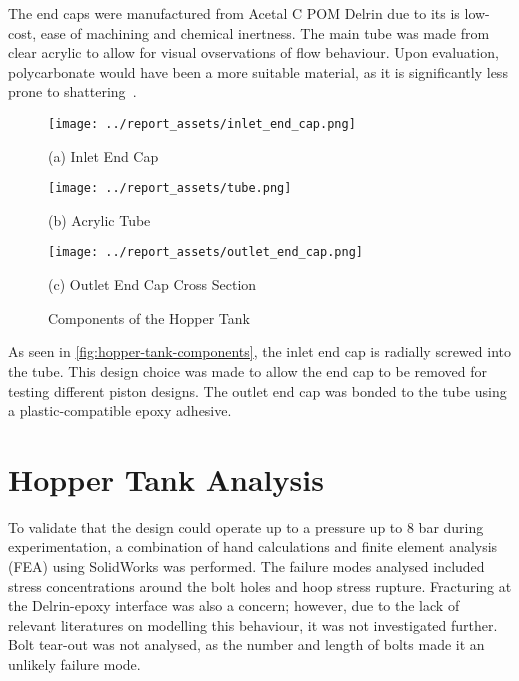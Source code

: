 The end caps were manufactured from Acetal C POM Delrin due to its is low-cost, ease of machining and chemical inertness. The main tube was made from clear acrylic to allow for visual ovservations of flow behaviour. Upon evaluation, polycarbonate would have been a more suitable material, as it is significantly less prone to shattering~\cite{SADEGHIESFAHLANI2021e06856}.
\begin{figure}[htbp]
    \centering

    \begin{minipage}{0.3\textwidth}
        \centering
        \texttt{[image: ../report\_assets/inlet\_end\_cap.png]}
        \caption*{(a) Inlet End Cap}
    \end{minipage}
    \hfill
    \begin{minipage}{0.3\textwidth}
        \centering
        \texttt{[image: ../report\_assets/tube.png]}
        \caption*{(b) Acrylic Tube}
    \end{minipage}
    \hfill
    \begin{minipage}{0.3\textwidth}
        \centering
        \texttt{[image: ../report\_assets/outlet\_end\_cap.png]}
        \caption*{(c) Outlet End Cap Cross Section}
    \end{minipage}
    \caption{Components of the Hopper Tank}\label{fig:hopper-tank-components}
\end{figure}
As seen in \autoref{fig:hopper-tank-components}, the inlet end cap is radially screwed into the tube. This design choice was made to allow the end cap to be removed for testing different piston designs. The outlet end cap was bonded to the tube using a plastic-compatible epoxy adhesive.

\section{Hopper Tank Analysis}\label{sec:tank-fea-setup}
To validate that the design could operate up to a pressure up to 8 bar during experimentation, a combination of hand calculations and finite element analysis (FEA) using SolidWorks was performed. The failure modes analysed included stress concentrations around the bolt holes and hoop stress rupture. Fracturing at the Delrin-epoxy interface was also a concern; however, due to the lack of relevant literatures on modelling this behaviour, it was not investigated further. Bolt tear-out was not analysed, as the number and length of bolts made it an unlikely failure mode.

